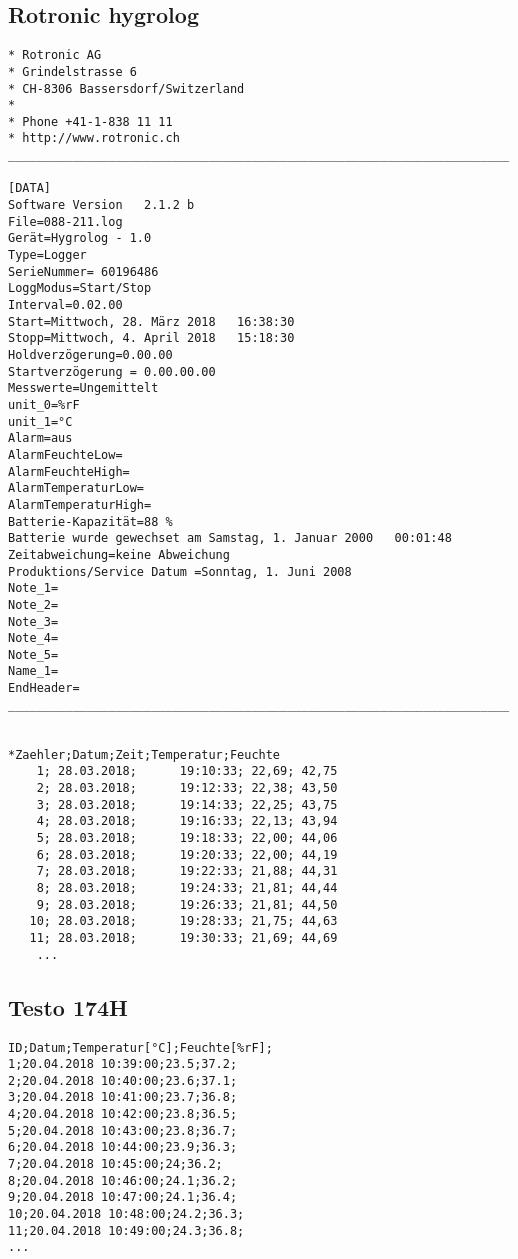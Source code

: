 \subsection*{Rotronic hygrolog}
\begin{lstlisting}[language={},inputencoding={utf8}]
* Rotronic AG
* Grindelstrasse 6 
* CH-8306 Bassersdorf/Switzerland   
* 
* Phone +41-1-838 11 11
* http://www.rotronic.ch
______________________________________________________________________

[DATA]
Software Version   2.1.2 b
File=088-211.log
Gerät=Hygrolog - 1.0
Type=Logger
SerieNummer= 60196486   
LoggModus=Start/Stop
Interval=0.02.00
Start=Mittwoch, 28. März 2018   16:38:30
Stopp=Mittwoch, 4. April 2018   15:18:30
Holdverzögerung=0.00.00
Startverzögerung = 0.00.00.00
Messwerte=Ungemittelt
unit_0=%rF
unit_1=°C
Alarm=aus
AlarmFeuchteLow=
AlarmFeuchteHigh=
AlarmTemperaturLow=
AlarmTemperaturHigh=
Batterie-Kapazität=88 %
Batterie wurde gewechset am Samstag, 1. Januar 2000   00:01:48
Zeitabweichung=keine Abweichung
Produktions/Service Datum =Sonntag, 1. Juni 2008
Note_1=
Note_2=
Note_3=
Note_4=
Note_5=
Name_1=
EndHeader=
______________________________________________________________________


*Zaehler;Datum;Zeit;Temperatur;Feuchte
    1; 28.03.2018;      19:10:33; 22,69; 42,75
    2; 28.03.2018;      19:12:33; 22,38; 43,50
    3; 28.03.2018;      19:14:33; 22,25; 43,75
    4; 28.03.2018;      19:16:33; 22,13; 43,94
    5; 28.03.2018;      19:18:33; 22,00; 44,06
    6; 28.03.2018;      19:20:33; 22,00; 44,19
    7; 28.03.2018;      19:22:33; 21,88; 44,31
    8; 28.03.2018;      19:24:33; 21,81; 44,44
    9; 28.03.2018;      19:26:33; 21,81; 44,50
   10; 28.03.2018;      19:28:33; 21,75; 44,63
   11; 28.03.2018;      19:30:33; 21,69; 44,69
	...
\end{lstlisting}
	
	
\subsection*{Testo 174H}
\begin{lstlisting}[language={},inputencoding={utf8}]
ID;Datum;Temperatur[°C];Feuchte[%rF];
1;20.04.2018 10:39:00;23.5;37.2;
2;20.04.2018 10:40:00;23.6;37.1;
3;20.04.2018 10:41:00;23.7;36.8;
4;20.04.2018 10:42:00;23.8;36.5;
5;20.04.2018 10:43:00;23.8;36.7;
6;20.04.2018 10:44:00;23.9;36.3;
7;20.04.2018 10:45:00;24;36.2;
8;20.04.2018 10:46:00;24.1;36.2;
9;20.04.2018 10:47:00;24.1;36.4;
10;20.04.2018 10:48:00;24.2;36.3;
11;20.04.2018 10:49:00;24.3;36.8;
...
\end{lstlisting}


